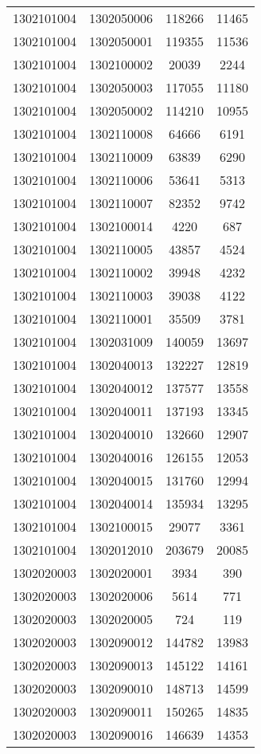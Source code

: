 \begin{longtable}[h]{llcc}
		1302101004 & 1302050006 & 118266 & 11465\\
		1302101004 & 1302050001 & 119355 & 11536\\
		1302101004 & 1302100002 & 20039 & 2244\\
		1302101004 & 1302050003 & 117055 & 11180\\
		1302101004 & 1302050002 & 114210 & 10955\\
		1302101004 & 1302110008 & 64666 & 6191\\
		1302101004 & 1302110009 & 63839 & 6290\\
		1302101004 & 1302110006 & 53641 & 5313\\
		1302101004 & 1302110007 & 82352 & 9742\\
		1302101004 & 1302100014 & 4220 & 687\\
		1302101004 & 1302110005 & 43857 & 4524\\
		1302101004 & 1302110002 & 39948 & 4232\\
		1302101004 & 1302110003 & 39038 & 4122\\
		1302101004 & 1302110001 & 35509 & 3781\\
		1302101004 & 1302031009 & 140059 & 13697\\
		1302101004 & 1302040013 & 132227 & 12819\\
		1302101004 & 1302040012 & 137577 & 13558\\
		1302101004 & 1302040011 & 137193 & 13345\\
		1302101004 & 1302040010 & 132660 & 12907\\
		1302101004 & 1302040016 & 126155 & 12053\\
		1302101004 & 1302040015 & 131760 & 12994\\
		1302101004 & 1302040014 & 135934 & 13295\\
		1302101004 & 1302100015 & 29077 & 3361\\
		1302101004 & 1302012010 & 203679 & 20085\\
		1302020003 & 1302020001 & 3934 & 390\\
		1302020003 & 1302020006 & 5614 & 771\\
		1302020003 & 1302020005 & 724 & 119\\
		1302020003 & 1302090012 & 144782 & 13983\\
		1302020003 & 1302090013 & 145122 & 14161\\
		1302020003 & 1302090010 & 148713 & 14599\\
		1302020003 & 1302090011 & 150265 & 14835\\
		1302020003 & 1302090016 & 146639 & 14353\\

\end{longtable}
